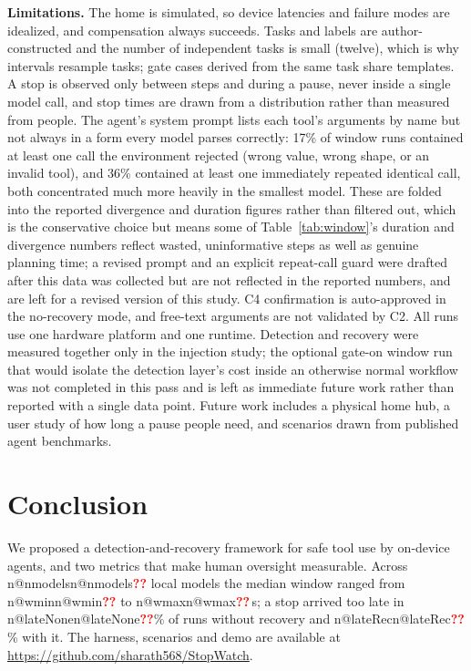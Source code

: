 \documentclass[conference]{IEEEtran}
\makeatletter
\newcommand{\pend}{\textcolor{red}{\textbf{??}}}
\newcommand{\num}[1]{\ifcsname n@#1\endcsname\csname n@#1\endcsname\else\pend\fi}
\makeatother
\begin{document}
\textbf{Limitations.} The home is simulated, so device latencies and failure modes are idealized, and compensation always succeeds. Tasks and labels are author-constructed and the number of independent tasks is small (twelve), which is why intervals resample tasks; gate cases derived from the same task share templates. A stop is observed only between steps and during a pause, never inside a single model call, and stop times are drawn from a distribution rather than measured from people. The agent's system prompt lists each tool's arguments by name but not always in a form every model parses correctly: 17\% of window runs contained at least one call the environment rejected (wrong value, wrong shape, or an invalid tool), and 36\% contained at least one immediately repeated identical call, both concentrated much more heavily in the smallest model. These are folded into the reported divergence and duration figures rather than filtered out, which is the conservative choice but means some of Table~\ref{tab:window}'s duration and divergence numbers reflect wasted, uninformative steps as well as genuine planning time; a revised prompt and an explicit repeat-call guard were drafted after this data was collected but are not reflected in the reported numbers, and are left for a revised version of this study. C4 confirmation is auto-approved in the no-recovery mode, and free-text arguments are not validated by C2. All runs use one hardware platform and one runtime. Detection and recovery were measured together only in the injection study; the optional gate-on window run that would isolate the detection layer's cost inside an otherwise normal workflow was not completed in this pass and is left as immediate future work rather than reported with a single data point. Future work includes a physical home hub, a user study of how long a pause people need, and scenarios drawn from published agent benchmarks.

\section{Conclusion}
We proposed a detection-and-recovery framework for safe tool use by on-device agents, and two metrics that make human oversight measurable. Across \num{nmodels} local models the median window ranged from \num{wmin} to \num{wmax}\,s; a stop arrived too late in \num{lateNone}\% of runs without recovery and \num{lateRec}\% with it. The harness, scenarios and demo are available at \url{https://github.com/sharath568/StopWatch}.
\end{document}
